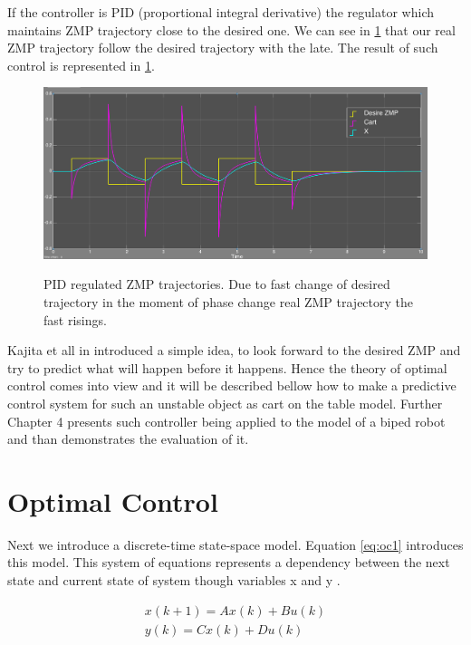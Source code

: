 \documentclass[12pt,a4paper]{report}
\begin{document}
			If the controller is PID (proportional integral derivative) the regulator which maintains ZMP trajectory close to the desired one. We can see in \cref{fig:10} that our real ZMP trajectory follow the desired trajectory with the late. The result of such control is represented in \cref{fig:10}.
			\begin{figure}[H]
				\vspace{-0.2cm}
				\centering
				{\includegraphics[width=1\textwidth]{10}}
				\caption{PID regulated ZMP trajectories. Due to fast change of desired trajectory in the moment of phase change real ZMP trajectory the fast risings.}
				\label{fig:10}
				\vspace{-0.1cm}
			\end{figure}
			Kajita et all in \cite{kajita2003biped} introduced a simple idea, to look forward to the desired ZMP  and try to predict what will happen before it happens. Hence the theory of optimal control comes into view and it will be described bellow how to make a predictive control system for such an unstable object as cart on the table model. Further Chapter 4 presents such controller being applied to the model of a biped robot and than demonstrates the evaluation of it.
			
		\section{Optimal Control}
			Next we introduce a discrete-time state-space model. Equation \ref{eq:oc1} introduces this model. This system of equations represents a dependency between the next state and current state of system though variables x and y \cite{hazell2008discrete}.
			
			\begin{equation}\label{eq:oc1}
				\begin{split}
					x(k+1) = Ax(k) + Bu(k)\\
					y(k) = Cx(k) + Du(k)
				\end{split}
			\end{equation}
			
\end{document}
